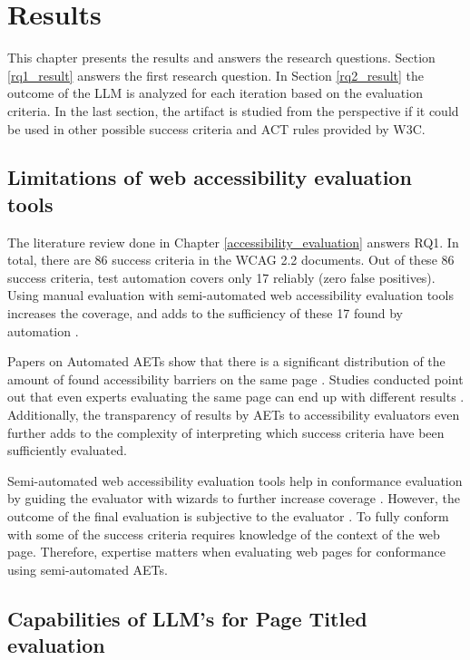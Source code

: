 \chapter{Results\label{results}}

This chapter presents the results and answers the research questions. Section \ref{rq1_result} answers the first research question. In Section \ref{rq2_result} the outcome of the LLM is analyzed for each iteration based on the evaluation criteria. In the last section, the artifact is studied from the perspective if it could be used in other possible success criteria and ACT rules provided by W3C.

\section{Limitations of web accessibility evaluation tools\label{rq1_result}}

The literature review done in Chapter \ref{accessibility_evaluation} answers RQ1. In total, there are 86 success criteria in the WCAG 2.2 documents. Out of these 86 success criteria, test automation covers only 17 reliably (zero false positives). Using manual evaluation with semi-automated web accessibility evaluation tools increases the coverage, and adds to the sufficiency of these 17 found by automation \citep{dequecoverage_semi}.

Papers on Automated AETs show that there is a significant distribution of the amount of found accessibility barriers on the same page \citep{comparison_10.1145/3371300.3383346, tool_analysis_directive}. Studies conducted point out that even experts evaluating the same page can end up with different results \citep{10.1145/1878803.1878813_testability_expertise}. Additionally, the transparency of results by AETs to accessibility evaluators even further adds to the complexity of interpreting which success criteria have been sufficiently evaluated.

Semi-automated web accessibility evaluation tools help in conformance evaluation by guiding the evaluator with wizards to further increase coverage \citep{dequecoverage_semi}. However, the outcome of the final evaluation is subjective to the evaluator \citep{10.1145/1878803.1878813_testability_expertise}. To fully conform with some of the success criteria requires knowledge of the context of the web page. Therefore, expertise matters when evaluating web pages for conformance using semi-automated AETs.

\section{Capabilities of LLM's for Page Titled evaluation\label{rq2_result}}

